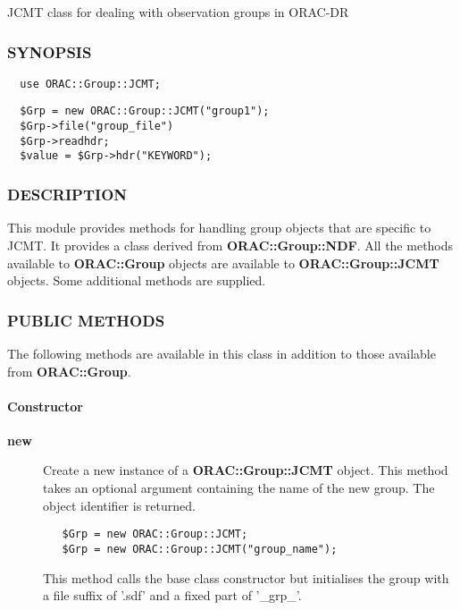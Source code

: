 JCMT class for dealing with observation groups in ORAC-DR

\subsubsection*{SYNOPSIS\label{ORAC::Group::JCMT_SYNOPSIS}}\begin{verbatim}
  use ORAC::Group::JCMT;
\end{verbatim}
\begin{verbatim}
  $Grp = new ORAC::Group::JCMT("group1");
  $Grp->file("group_file")
  $Grp->readhdr;
  $value = $Grp->hdr("KEYWORD");
\end{verbatim}
\subsubsection*{DESCRIPTION\label{ORAC::Group::JCMT_DESCRIPTION}}

This module provides methods for handling group objects that
are specific to JCMT. It provides a class derived from \textbf{ORAC::Group::NDF}.
All the methods available to \textbf{ORAC::Group} objects are available
to \textbf{ORAC::Group::JCMT} objects. Some additional methods are supplied.

\subsubsection*{PUBLIC METHODS\label{ORAC::Group::JCMT_PUBLIC_METHODS}}

The following methods are available in this class in addition to
those available from \textbf{ORAC::Group}.

\paragraph*{Constructor\label{ORAC::Group::JCMT_Constructor}}\begin{description}
\item[\textbf{new}] \mbox{}

Create a new instance of a \textbf{ORAC::Group::JCMT} object.
This method takes an optional argument containing the
name of the new group. The object identifier is returned.

\begin{verbatim}
   $Grp = new ORAC::Group::JCMT;
   $Grp = new ORAC::Group::JCMT("group_name");
\end{verbatim}


This method calls the base class constructor but initialises
the group with a file suffix of '.sdf' and a fixed part
of '\_grp\_'.

\end{description}

